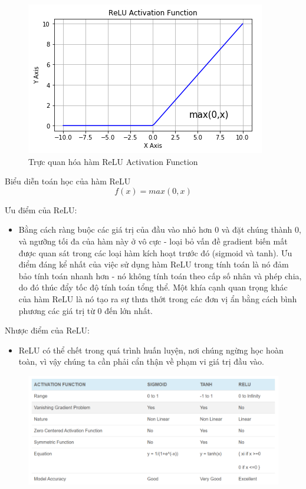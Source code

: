 \documentclass{article}
\begin{document}
	\begin{figure}[H]
		\centering
		\includegraphics[width=0.75\linewidth]{images/relu_activation_function.png}
		\caption{Trực quan hóa hàm ReLU Activation Function}
		\label{fig:writing-thesis}
	\end{figure}
	Biểu diễn toán học của hàm ReLU
	$$f(x) = max(0, x)$$
	
	Ưu điểm của ReLU:
	\begin{itemize}
		\item Bằng cách ràng buộc các giá trị của đầu vào nhỏ hơn 0 và đặt chúng thành 0, và ngưỡng tối đa của hàm này ở vô cực - loại bỏ vấn đề gradient biến mất được quan sát trong các loại hàm kích hoạt trước đó (sigmoid và tanh). Ưu điểm đáng kể nhất của việc sử dụng hàm ReLU trong tính toán là nó đảm bảo tính toán nhanh hơn - nó không tính toán theo cấp số nhân và phép chia, do đó thúc đẩy tốc độ tính toán tổng thể. Một khía cạnh quan trọng khác của hàm ReLU là nó tạo ra sự thưa thớt trong các đơn vị ẩn bằng cách bình phương các giá trị từ 0 đến lớn nhất.
	\end{itemize}
	Nhược điểm của ReLU:
	\begin{itemize}
		\item ReLU có thể chết trong quá trình huấn luyện, nơi chúng ngừng học hoàn toàn, vì vậy chúng ta cần phải cẩn thận về phạm vi giá trị đầu vào.
	\end{itemize}
	\begin{figure}[H]
		\centering
		\includegraphics[width=0.75\linewidth]{images/a5_6.png}
		\label{fig:writing-thesis}
	\end{figure}
\end{document}
